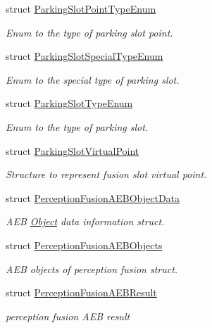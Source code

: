 \begin{DoxyCompactItemize}
struct \hyperlink{structmaf__perception__interface_1_1ParkingSlotPointTypeEnum}{Parking\+Slot\+Point\+Type\+Enum}
\begin{DoxyCompactList}\small\item\em Enum to the type of parking slot point. \end{DoxyCompactList}\item 
struct \hyperlink{structmaf__perception__interface_1_1ParkingSlotSpecialTypeEnum}{Parking\+Slot\+Special\+Type\+Enum}
\begin{DoxyCompactList}\small\item\em Enum to the special type of parking slot. \end{DoxyCompactList}\item 
struct \hyperlink{structmaf__perception__interface_1_1ParkingSlotTypeEnum}{Parking\+Slot\+Type\+Enum}
\begin{DoxyCompactList}\small\item\em Enum to the type of parking slot. \end{DoxyCompactList}\item 
struct \hyperlink{structmaf__perception__interface_1_1ParkingSlotVirtualPoint}{Parking\+Slot\+Virtual\+Point}
\begin{DoxyCompactList}\small\item\em Structure to represent fusion slot virtual point. \end{DoxyCompactList}\item 
struct \hyperlink{structmaf__perception__interface_1_1PerceptionFusionAEBObjectData}{Perception\+Fusion\+A\+E\+B\+Object\+Data}
\begin{DoxyCompactList}\small\item\em A\+EB \hyperlink{structmaf__perception__interface_1_1Object}{Object} data information struct. \end{DoxyCompactList}\item 
struct \hyperlink{structmaf__perception__interface_1_1PerceptionFusionAEBObjects}{Perception\+Fusion\+A\+E\+B\+Objects}
\begin{DoxyCompactList}\small\item\em A\+EB objects of perception fusion struct. \end{DoxyCompactList}\item 
struct \hyperlink{structmaf__perception__interface_1_1PerceptionFusionAEBResult}{Perception\+Fusion\+A\+E\+B\+Result}
\begin{DoxyCompactList}\small\item\em perception fusion A\+EB result \end{DoxyCompactList}\item 

\end{DoxyCompactItemize}
